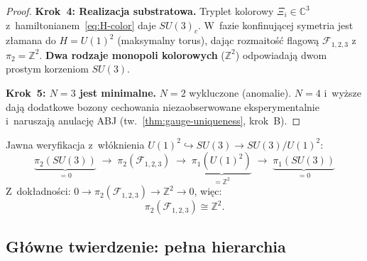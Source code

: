 \begin{proof}
\textbf{Krok~4: Realizacja substratowa.}
Tryplet kolorowy $\Xi_i \in \mathbb{C}^3$
z~hamiltonianem~\eqref{eq:H-color} daje $SU(3)_c$.
W~fazie konfinuj\k{a}cej symetria jest z\l{}amana do
$H = U(1)^2$ (maksymalny torus), daj\k{a}c
rozmaito\'s\'c flagow\k{a} $\mathcal{F}_{1,2,3}$
z~$\pi_2 = \mathbb{Z}^2$. \textbf{Dwa rodzaje monopoli
kolorowych} ($\mathbb{Z}^2$) odpowiadaj\k{a} dwom
prostym korzeniom $SU(3)$.

\textbf{Krok~5: $N = 3$ jest minimalne.}
$N = 2$ wykluczone (anomalie). $N = 4$ i~wy\.zsze daj\k{a}
dodatkowe bozony cechowania niezaobserwowane eksperymentalnie
i~naruszaj\k{a} anulacj\k{e} ABJ (tw.~\ref{thm:gauge-uniqueness},
krok~B).
\end{proof}

\begin{remark}\label{rem:D2-SU3-exact}
Jawna weryfikacja z~w\l{}\'oknienia $U(1)^2 \hookrightarrow SU(3)
\to SU(3)/U(1)^2$:
\[
  \underbrace{\pi_2(SU(3))}_{= 0}
  \;\to\; \pi_2(\mathcal{F}_{1,2,3})
  \;\to\; \underbrace{\pi_1(U(1)^2)}_{= \mathbb{Z}^2}
  \;\to\; \underbrace{\pi_1(SU(3))}_{= 0}
\]
Z~dok\l{}adno\'sci: $0 \to \pi_2(\mathcal{F}_{1,2,3})
\to \mathbb{Z}^2 \to 0$, wi\k{e}c:
\begin{equation}\label{eq:D2-pi2-flag-explicit}
  \pi_2(\mathcal{F}_{1,2,3}) \cong \mathbb{Z}^2.
\end{equation}
\end{remark}

\subsection{G\l{}\'owne twierdzenie: pe\l{}na hierarchia}%
\label{ssec:D2-main-theorem}

